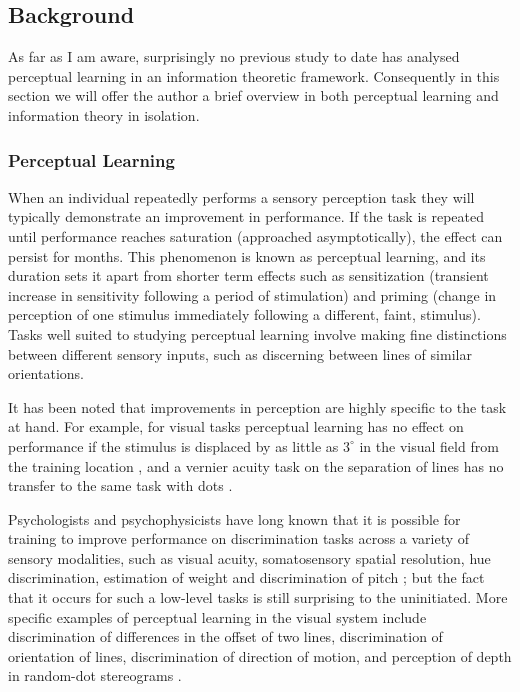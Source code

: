 \subsection{Background}
\label{ch:bg}

As far as I am aware, surprisingly no previous study to date has analysed perceptual learning in an information theoretic framework.
Consequently in this section we will offer the author a brief overview in both perceptual learning and information theory in isolation.

\subsubsection{Perceptual Learning}
\label{sec:bgpl}

When an individual repeatedly performs a sensory perception task they will typically demonstrate an improvement in performance. If the task is repeated until performance reaches saturation (approached asymptotically), the effect can persist for months. This phenomenon is known as perceptual learning, and its duration sets it apart from shorter term effects such as sensitization (transient increase in sensitivity following a period of stimulation) and priming (change in perception of one stimulus immediately following a different, faint, stimulus).
Tasks well suited to studying perceptual learning involve making fine distinctions between different sensory inputs, such as discerning between lines of similar orientations.

It has been noted that improvements in perception are highly specific to the task at hand. For example, for visual tasks perceptual learning has no effect on performance if the stimulus is displaced by as little as $3^\circ$ in the visual field from the training location \cite{Gilbert1994}, 
and a vernier acuity task on the separation of lines has no transfer to the same task with dots \cite{Poggio1992}.


Psychologists and psychophysicists have long known that it is possible for training to improve performance on discrimination tasks across a variety of sensory modalities, such as visual acuity, somatosensory spatial resolution, hue discrimination, estimation of weight and discrimination of pitch \cite{Gilbert2001}; but the fact that it occurs for such a low-level tasks is still surprising to the uninitiated. More specific examples of perceptual learning in the visual system include discrimination of differences in the offset of two lines, discrimination of orientation of lines, discrimination of direction of motion, and perception of depth in random-dot stereograms \cite{Gilbert2001,Fine2002}.

